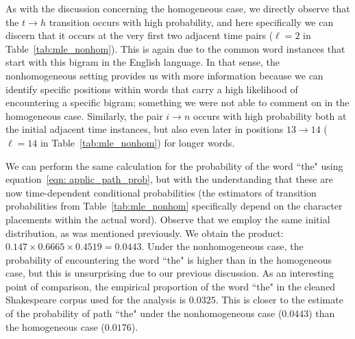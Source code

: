 \documentclass[11pt, a4paper]{article}
\numberwithin{equation}{section}
\theoremstyle{plain}
\theoremstyle{definition}
\begin{document}
As with the discussion concerning the homogeneous case, we directly observe that the $t\rightarrow h$ transition occurs with high probability, and here specifically we can discern that it occurs at the very first two adjacent time pairs ($\ell=2$ in Table~\ref{tab:mle_nonhom}). This is again due to the common word instances that start with this bigram in the English language. In that sense, the nonhomogeneous setting provides us with more information because we can identify specific positions within words that carry a high likelihood of encountering a specific bigram; something we were not able to comment on in the homogeneous case. Similarly, the pair $i \rightarrow n$ occurs with high probability both at the initial adjacent time instances, but also even later in positions $13\rightarrow 14$ ($\ell=14$ in Table~\ref{tab:mle_nonhom}) for longer words. 

We can perform the same calculation for the probability of the word ``the" using equation~\eqref{eqn: applic_path_prob}, but with the understanding that these are now time-dependent conditional probabilities (the estimators of transition probabilities from Table~\ref{tab:mle_nonhom} specifically depend on the character placements within the actual word). Observe that we employ the same initial distribution, as was mentioned previously. We obtain the product: $0.147 \times 0.6665 \times 0.4519 = 0.0443. $ Under the nonhomogeneous case, the probability of encountering the word ``the" is higher than in the homogeneous case, but this is unsurprising due to our previous discussion. As an interesting point of comparison, the empirical proportion of the word ``the" in the cleaned Shakespeare corpus used for the analysis is $0.0325.$ This is closer to the estimate of the probability of path ``the" under the nonhomogeneous case ($0.0443$) than the homogeneous case ($0.0176$).
\end{document}
